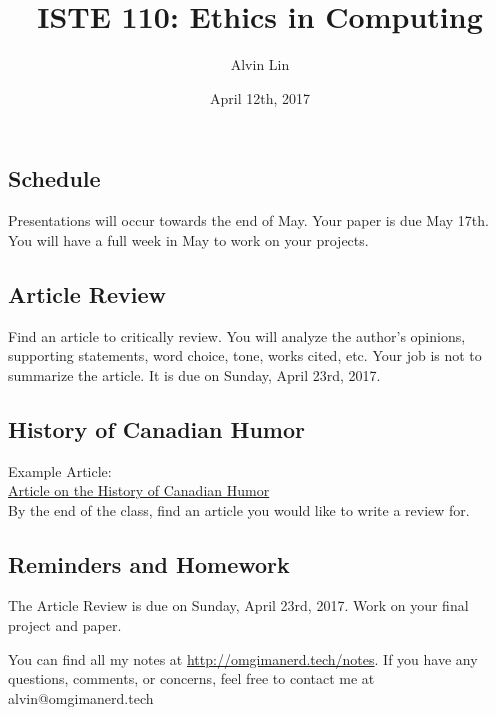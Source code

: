 \documentclass[letterpaper, 12pt]{article}
\title{ISTE 110: Ethics in Computing}
\author{Alvin Lin}
\date{April 12th, 2017}
\begin{document}
\maketitle

\subsection*{Schedule}
Presentations will occur towards the end of May. Your paper is due May 17th.
You will have a full week in May to work on your projects.

\subsection*{Article Review}
Find an article to critically review. You will analyze the author's opinions,
supporting statements, word choice, tone, works cited, etc. Your job is not
to summarize the article. It is due on Sunday, April 23rd, 2017.

\subsection*{History of Canadian Humor}
Example Article: \\
\href{http://www.vanityfair.com/culture/2013/01/history-canadian-humor}
{Article on the History of Canadian Humor} \\
By the end of the class, find an article you would like to write a review for.

\subsection*{Reminders and Homework}
The Article Review is due on Sunday, April 23rd, 2017.
Work on your final project and paper.

\begin{center}
  You can find all my notes at \url{http://omgimanerd.tech/notes}. If you have
  any questions, comments, or concerns, feel free to contact me at
  alvin@omgimanerd.tech
\end{center}
\end{document}
